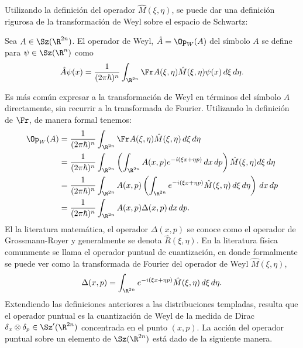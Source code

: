   Utilizando la definición del operador $\hat{M}(\xi,\eta)$,
  se puede dar una definición rigurosa de la transformación
  de Weyl sobre el espacio de Schwartz:
  \begin{definition}
    Sea $A \in \Sz(\R^{2n})$. El operador de Weyl, $\hat{A}
    = \Op_W(A)$ del símbolo $A$ se define para $\psi \in
    \Sz(\R^{n})$ como
    \begin{equation}
      \label{eqn:weyl_quant_2}
      \hat{A}\psi(x)
      = \frac{1}{(2\pi\hbar)^{n}}
      \int_{\R^{2n}} \Fr A(\xi,\eta) \hat{M}(\xi,\eta)
      \psi(x) \, d\xi \, d\eta.
    \end{equation}
  \end{definition}
  Es más común expresar a la transformación de Weyl en términos
  del símbolo $A$ directamente, sin recurrir a la
  transformada de Fourier. Utilizando la definición de $\Fr$,
  de manera formal tenemos:
  \begin{align*}
    \Op_W(A)
    &= \frac{1}{(2\pi\hbar)^{n}} \int_{\R^{2n}} \Fr
    A(\xi,\eta)\hat{M}(\xi,\eta) \, d\xi \, d\eta \\
    &= \frac{1}{(2\pi\hbar)^{n}} \int_{\R^{2n}} \left(
    \int_{\R^{2n}} A(x,p)e^{-i(\xi x + \eta p)} \, dx \, dp
    \right) \hat{M}(\xi,\eta) d\xi \, d\eta \\
    &= \frac{1}{(2\pi\hbar)^{n}} \int_{\R^{2n}} A(x,p) \left(
    \int_{\R^{2n}} e^{-i(\xi x + \eta p)} \hat{M}(\xi,\eta)
    \, d\xi \, d\eta \right) \, dx \, dp \\
    &= \frac{1}{(2\pi\hbar)^{n}} \int_{\R^{2n}} A(x,p)
    \Delta(x,p) \, dx \, dp.
  \end{align*} 
  El la literatura matemática, el operador $\Delta(x,p)$ se
  conoce como el operador de Grossmann-Royer y generalmente
  se denota $\hat{R}(\xi,\eta)$. En la literatura física
  comunmente se llama el operador puntual de cuantización,
  en donde formalmente se puede ver como la transformada de
  Fourier del operador de Weyl $\hat{M}(\xi,\eta)$,
  \begin{equation}
    \label{eqn:phase_point_operator}
    \Delta(x,p)
    = \int_{\R^{2n}} e^{-i(\xi x + \eta p)}
    \hat{M}(\xi,\eta) \, d\xi \, d\eta.
  \end{equation}
  Extendiendo las definiciones anteriores a las
  distribuciones templadas, resulta que el operador puntual
  es la cuantización de Weyl de la medida de Dirac $\delta_x
  \otimes \delta_p \in \Sz'(\R^{2n})$ concentrada en el
  punto $(x,p)$. La acción del operador puntual sobre un
  elemento de $\Sz(\R^{2n})$ está dado de la siguiente
  manera.


